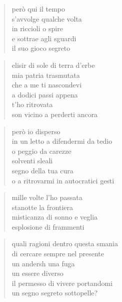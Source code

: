 	\begin{verse}
                però qui il tempo\\
                s’avvolge qualche volta\\
                in riccioli o spire\\
                e sottrae agli sguardi\\
                il suo gioco segreto
	\end{verse}

	\begin{verse}
                elisir di sole di terra d’erbe\\
                mia patria trasmutata\\
                che a me ti nascondevi\\
                a dodici passi appena\\
                t’ho ritrovata\\
                son vicino a perderti ancora
	\end{verse}

	\begin{verse}
                però io disperso\\
                in un letto a difendermi da tedio\\
                o peggio da carezze\\
                solventi sleali\\
                segno della tua cura\\
                o a ritrovarmi in autocratici gesti
	\end{verse}

	\begin{verse}
                mille volte l’ho passata\\
                stanotte la frontiera\\
                misticanza di sonno e veglia\\
                esplosione di frammenti
	\end{verse}

	\begin{verse}
                quali ragioni dentro questa smania\\
                di cercare sempre nel presente\\
                un andersh una fuga\\
                un essere diverso\\
                il permesso di vivere portandomi\\
                un segno segreto sottopelle?
	\end{verse}


